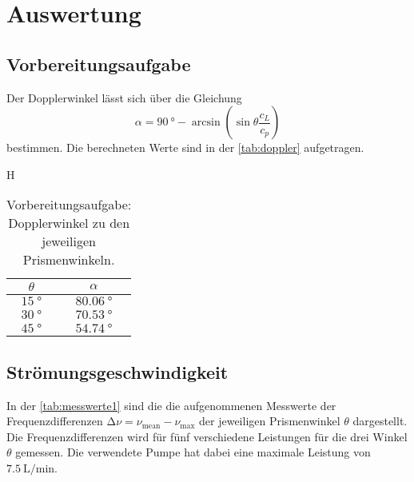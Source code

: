 \section{Auswertung}
\label{sec:auswertung}

\subsection{Vorbereitungsaufgabe}
\label{sec:Vorbereitungsaufgabe}

Der Dopplerwinkel lässt sich über die Gleichung 
\begin{equation*}
    \alpha = \qty{90}{°} - \arcsin\left(\sin\theta \frac{c_L}{c_p}\right)
\end{equation*}
bestimmen. Die berechneten Werte sind in der \autoref{tab:doppler} aufgetragen.

\begin{table}{H}
    \centering
    \caption{Vorbereitungsaufgabe: Dopplerwinkel zu den jeweiligen Prismenwinkeln.}
    \label{tab:doppler}
\begin{tabular}{c c}
    \toprule
    $\theta$ & $\alpha$ \\
    \midrule
    $\qty{15}{°}$ & $\qty{80.06}{°}$ \\
    $\qty{30}{°}$ & $\qty{70.53}{°}$ \\
    $\qty{45}{°}$ & $\qty{54.74}{°}$ \\
    \bottomrule
\end{tabular}
\end{table}

\subsection{Strömungsgeschwindigkeit}
\label{sec:Strömungsgeschwindigkeit}

In der \autoref{tab:messwerte1} sind die die aufgenommenen Messwerte der Frequenzdifferenzen $ \increment \nu = \nu_{\text{mean}} - \nu_{\text{max}}$ 
der jeweiligen Prismenwinkel $\theta$ dargestellt. Die Frequenzdifferenzen wird für fünf verschiedene Leistungen für die drei Winkel $\theta$ gemessen. Die 
verwendete Pumpe hat dabei eine maximale Leistung von $\SI{7.5}{\liter\per\minute}$.

